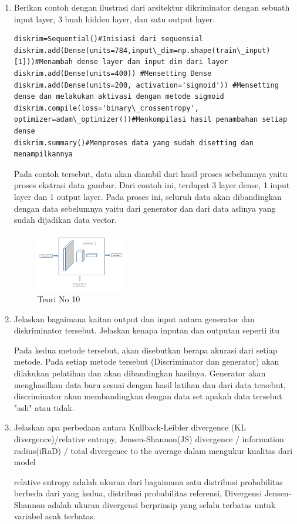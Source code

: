 \begin{enumerate}
            \item Berikan contoh dengan ilustrasi dari arsitektur dikriminator dengan sebuath input layer, 3 buah hidden layer, dan satu output layer.
\begin{verbatim}
diskrim=Sequential()#Inisiasi dari sequensial
diskrim.add(Dense(units=784,input\_dim=np.shape(train\_input)[1]))#Menambah dense layer dan input dim dari layer
diskrim.add(Dense(units=400)) #Mensetting Dense
diskrim.add(Dense(units=200, activation='sigmoid')) #Mensetting dense dan melakukan aktivasi dengan metode sigmoid
diskrim.compile(loss='binary\_crossentropy', optimizer=adam\_optimizer())#Menkompilasi hasil penambahan setiap dense
diskrim.summary()#Memproses data yang sudah disetting dan menampilkannya
\end{verbatim}
            \par Pada contoh tersebut, data akan diambil dari hasil proses sebelumnya yaitu proses ekstrasi data gambar. Dari contoh ini, terdapat 3 layer dense, 1 input layer dan 1 output layer. Pada proses ini, seluruh data akan dibandingkan dengan data sebelumnya yaitu dari generator dan dari data aslinya yang sudah dijadikan data vector. 
            \begin{figure}[H]
                \includegraphics[width=4cm]{figures/1174040/chapter8/teori10.png}
                \centering
                  \caption{Teori No 10}
            \end{figure}
            
            \item Jelaskan bagaimana kaitan output dan input antara generator dan diskriminator tersebut. Jelaskan kenapa inputan dan outputan seperti itu
            \par Pada kedua metode tersebut, akan disebutkan berapa akurasi dari setiap metode. Pada setiap metode tersebut (Discriminator dan generator) akan dilakukan pelatihan dan akan dibandingkan hasilnya. Generator akan menghasilkan data baru sesuai dengan hasil latihan dan dari data tersebut, discriminator akan membandingkan dengan data set apakah data tersebut "asli" atau tidak.
            
            \item Jelaskan apa perbedaan antara Kullback-Leibler divergence (KL divergence)/relative entropy, Jensen-Shannon(JS) divergence / information radius(iRaD) / total divergence to the average dalam mengukur kualitas dari model
            \par relative entropy adalah ukuran dari bagaimana satu distribusi probabilitas berbeda dari yang kedua, distribusi probabilitas referensi, Divergensi Jensen-Shannon adalah ukuran divergensi berprinsip yang selalu terbatas untuk variabel acak terbatas.


\end{enumerate}

